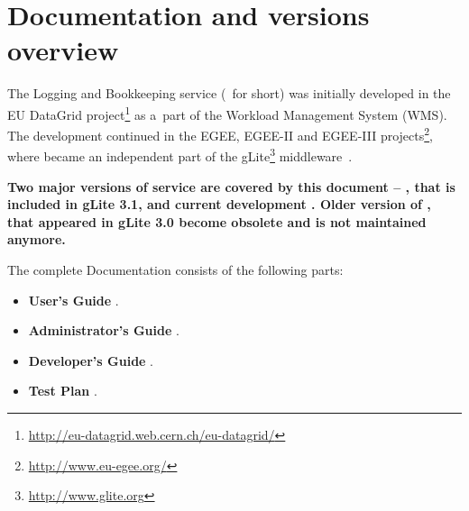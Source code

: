 \section*{\LB Documentation and versions overview}

The Logging and Bookkeeping service (\LB\ for short) was initially developed in
the EU DataGrid
project\footnote{\url{http://eu-datagrid.web.cern.ch/eu-datagrid/}} as a~part
of the Workload Management System (WMS). The development continued in the EGEE,
EGEE-II and EGEE-III projects\footnote{\url{http://www.eu-egee.org/}}, where
\LB became an independent part of the
gLite\footnote{\url{http://www.glite.org}} middleware~\cite{glite}.

\textbf{Two major versions of \LB service are covered by this document -- \LBold, 
that is included in gLite 3.1, and current development \LBnew. Older version of \LB, 
that appeared in gLite 3.0 become obsolete and is not maintained anymore.}

The complete \LB Documentation consists of the following parts:
\begin{itemize}
\item \textbf{\LB User's Guide} 
   \ifx\insideUG{}\fi. 
   
\item \textbf{\LB Administrator's Guide} 
   \ifx\insideAG{}\fi. 
   
\item \textbf{\LB Developer's Guide} 
   \ifx\insideDG{}\fi. 
   
\item \textbf{\LB Test Plan} 
   \ifx\insideTP{}\fi. 
   
\end{itemize}

